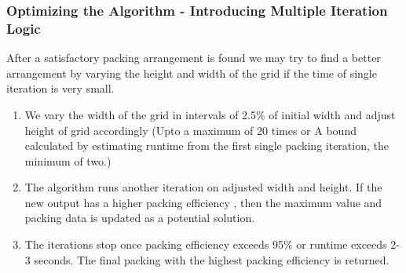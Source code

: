 \documentclass[12pt, a4paper,openany]{article}
\begin{document}
\subsubsection{Optimizing the Algorithm - Introducing Multiple Iteration Logic}\label{subsubsec:MITL}

After a satisfactory packing arrangement is found we may try to find a better arrangement by varying the height and width of the grid if the time of single iteration is very small.
\begin{enumerate}
    \item We vary the width of the grid in intervals of 2.5\% of initial width and adjust height of grid accordingly (Upto a maximum of 20 times or A bound calculated by estimating runtime from the first single packing iteration, the minimum of two.)
    \item The algorithm runs another iteration on adjusted width and height. If the new output has a higher packing efficiency , then the maximum value and packing data is updated as a potential solution.
    \item The iterations stop once packing efficiency exceeds 95\% or runtime exceeds 2-3 seconds. The final packing with the highest packing efficiency is returned.
\end{enumerate}
\end{document}
